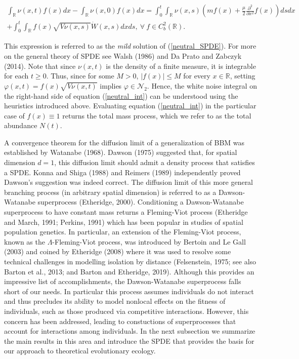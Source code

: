 \documentclass[]{elsarticle} %
\begin{document}
\begin{multline}\label{neutral_int}
\int_\mathbb{R}\nu(x,t)f(x)dx-\int_\mathbb{R}\nu(x,0)f(x)dx=\int_0^t\int_\mathbb{R}\nu(x,s)\left(mf(x)+\frac{\mu}{2}\frac{\partial^2}{\partial x^2}f(x)\right)dsdx \\
+\int_0^t\int_\mathbb{R}f(x)\sqrt{V\nu(x,s)}\dot W(x,s)dxds, \ \forall \ f\in C_b^2(\mathbb{R}).
\end{multline}

This expression is referred to as the \emph{mild} solution of
(\ref{neutral_SPDE}). For more on the general theory of SPDE see Walsh
(1986) and Da Prato and Zabczyk (2014). Note that since \(\nu(x,t)\) is
the density of a finite measure, it is integrable for each \(t\geq0\).
Thus, since for some \(M>0\), \(|f(x)|\leq M\) for every
\(x\in\mathbb{R}\), setting \(\varphi(x,t)=f(x)\sqrt{V\nu(x,t)}\)
implies \(\varphi\in\mathscr{N}_2\). Hence, the white noise integral on
the right-hand side of equation (\ref{neutral_int}) can be understood
using the heuristics introduced above. Evaluating equation
(\ref{neutral_int}) in the particular case of \(f(x)\equiv1\) returns
the total mass process, which we refer to as the total abundance
\(N(t)\).

A convergence theorem for the diffusion limit of a generalization of BBM
was established by Watanabe (1968). Dawson (1975) suggested that, for
spatial dimension \(d=1\), this diffusion limit should admit a density
process that satisfies a SPDE. Konna and Shiga (1988) and Reimers (1989)
independently proved Dawson's suggestion was indeed correct. The
diffusion limit of this more general branching process (in arbitrary
spatial dimension) is referred to as a Dawson-Watanabe superprocess
(Etheridge, 2000). Conditioning a Dawson-Watanabe superprocess to have
constant mass returns a Fleming-Viot process (Etheridge and March, 1991;
Perkins, 1991) which has been popular in studies of spatial population
genetics. In particular, an extension of the Fleming-Viot process, known
as the \(\Lambda\)-Fleming-Viot process, was introduced by Bertoin and
Le Gall (2003) and coined by Etheridge (2008) where it was used to
resolve some technical challenges in modelling isolation by distance
(Felsenstein, 1975; see also Barton et al., 2013; and Barton and
Etheridge, 2019). Although this provides an impressive list of
accomplishments, the Dawson-Watanabe superprocess falls short of our
needs. In particular this process assumes individuals do not interact
and thus precludes its ability to model nonlocal effects on the fitness
of individuals, such as those produced via competitive interactions.
However, this concern has been addressed, leading to constuctions of
superprocesses that account for interactions among individuals. In the
next subsection we summarize the main results in this area and introduce
the SPDE that provides the basis for our approach to theoretical
evolutionary ecology.
\end{document}
